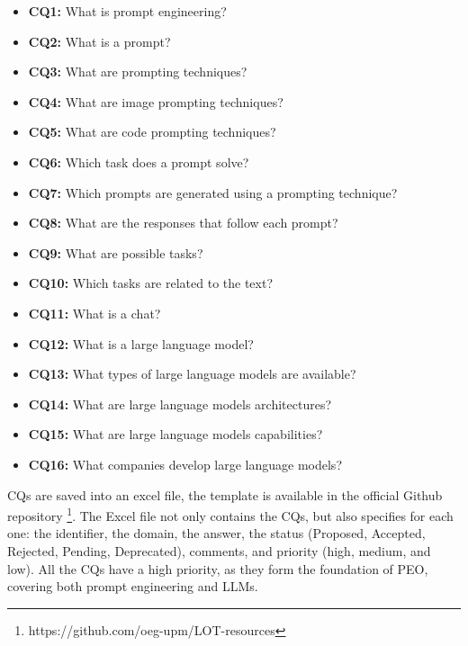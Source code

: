 \begin{itemize}
    \item \textbf{CQ1:} What is prompt engineering?

    \item \textbf{CQ2:} What is a prompt?

    \item \textbf{CQ3:} What are prompting techniques?

    \item \textbf{CQ4:} What are image prompting techniques?

    \item \textbf{CQ5:} What are code prompting techniques?

    \item \textbf{CQ6:} Which task does a prompt solve?

    \item \textbf{CQ7:} Which prompts are generated using a prompting technique?

    \item \textbf{CQ8:} What are the responses that follow each prompt?

    \item \textbf{CQ9:} What are possible tasks?

    \item \textbf{CQ10:} Which tasks are related to the text?

    \item \textbf{CQ11:} What is a chat?

    \item \textbf{CQ12:} What is a large language model?

    \item \textbf{CQ13:} What types of large language models are available?

    \item \textbf{CQ14:} What are large language models architectures?

    \item \textbf{CQ15:} What are large language models capabilities?

    \item \textbf{CQ16:} What companies develop large language models?
\end{itemize}

CQs are saved into an excel file, the template is available in the official Github repository \footnote{https://github.com/oeg-upm/LOT-resources}.
The Excel file not only contains the CQs, but also specifies for each one: the identifier, the domain, the answer, the status (Proposed, Accepted, Rejected, Pending, Deprecated), comments, and priority (high, medium, and low).
All the CQs have a high priority, as they form the foundation of PEO, covering both prompt engineering and LLMs.

